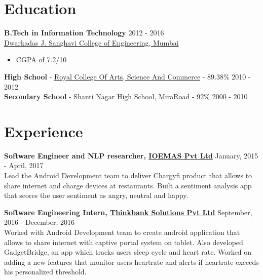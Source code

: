 \documentclass[margin, centered]{res}
\begin{document}
\vspace{-7mm}
\begin{resume}
\section{Education}
\textbf{B.Tech in Information Technology} \hfill 2012 - 2016 \\
\href{http://www.djsce.ac.in/}{Dwarkadas J. Sanghavi College of Engineering, Mumbai}
\begin{itemize}
 \item CGPA of {7.2}/10 
\end{itemize}
\textbf{High School} - \href{http://royalcollegemiraroad.edu.in/}{Royal College Of Arts, Science And Commerce} - 89.38\% \hfill 2010 - 2012 \\
\textbf{Secondary School} - Shanti Nagar High School, MiraRoad - 92\% \hfill 2000 - 2010

\section{Experience}
\textbf{Software Engineer and NLP researcher, \href{www.google.com}{IOEMAS Pvt Ltd}} \hfill January, 2015 - April, 2017\\
Lead the Android Development team to deliver Chargyfi product that allows to share internet and charge devices at restaurants. Built a sentiment analysis app that scores the user sentiment as angry, neutral and happy.

\textbf{Software Engineering Intern, \href{www.google.com}{Thinkbank Solutions Pvt Ltd}} \hfill September, 2016 - December, 2016\\
Worked with Android Development team to create android application that allows to share internet with captive portal system on tablet.
Also developed GadgetBridge, an app which tracks users sleep cycle and heart rate. Worked on adding a new features that monitor users heartrate and alerts if heartrate exceeds his personalized threshold.\\



\end{resume}
\end{document}
